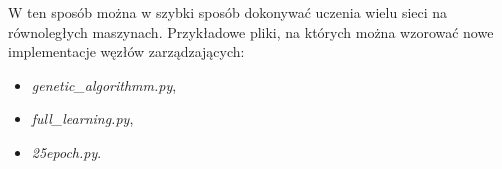 W ten sposób można w szybki sposób dokonywać uczenia wielu sieci na równoległych maszynach.
Przykładowe pliki, na których można wzorować nowe implementacje węzłów zarządzających:

\begin{itemize}
  \item \textit{genetic\_algorithmm.py},
  \item \textit{full\_learning.py},
  \item \textit{25epoch.py}.
\end{itemize}
